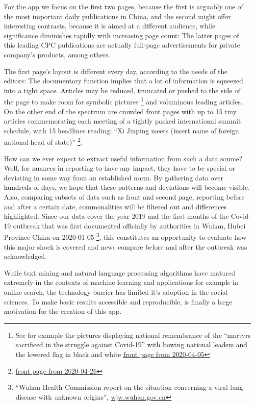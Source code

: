 \documentclass[12pt,a4paper]{article}
\let\rmarkdownfootnote\footnote%
\def\footnote{\protect\rmarkdownfootnote}
\begin{document}
For the app we focus on the first two pages, because the first is arguably one of the most important daily publications in China, and the second might offer interesting contrasts, because it is aimed at a different audience, while significance diminishes rapidly with increasing page count: The latter pages of this leading CPC publications are actually full-page advertisements for private company's products, among others.

The first page's layout is different every day, according to the needs of the editors: The documentory function implies that a lot of information is squeezed into a tight space. Articles may be reduced, truncated or pushed to the side of the page to make room for symbolic pictures \footnote{See for example the pictures displaying national remembrance of the \enquote{martyrs sacrificed in the struggle against Covid-19} with bowing national leaders and the lowered flag in black and white \href{http://paper.people.com.cn/rmrb/html/2020-04/05/nw.D110000renmrb_20200405_1-01.htm}{front page from 2020-04-05}} and voluminous leading articles. On the other end of the spectrum are crowded front pages with up to 15 tiny articles commemorating each meeting of a tightly packed international summit schedule, with 15 headlines reading: \enquote{Xi Jinping meets (insert name of foreign national head of state)} \footnote{\href{http://paper.people.com.cn/rmrb/html/2019-04/26/nbs.D110000renmrb_01.htm}{front page from 2020-04-26}}.

How can we ever expect to extract useful information from such a data source? Well, for nuances in reporting to have any impact, they have to be special or deviating in some way from an established norm. By gathering data over hundreds of days, we hope that these patterns and deviations will become visible. Also, comparing subsets of data such as front and second page, reporting before and after a certain date, commonalities will be filtered out and differences highlighted. Since our data cover the year 2019 and the first months of the Covid-19 outbreak that was first documented officially by authorities in Wuhan, Hubei Province China on 2020-01-05 \footnote{\enquote{Wuhan Health Commission report on the situation concerning a viral lung disease with unknown origins}, \href{http://wjw.wuhan.gov.cn/front/web/showDetail/2020010509020}{wjw.wuhan.gov.cn}}, this constitutes an opportunity to evaluate how this major shock is covered and news compare before and after the outbreak was acknowledged.

While text mining and natural language processing algorithms have matured extremely in the contexts of machine learning and applications for example in online search, the technology barrier has limited it's adoption in the social sciences. To make basic results accessible and reproducible, is finally a large motivation for the creation of this app.
\end{document}
